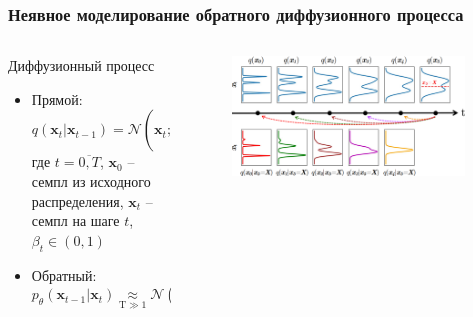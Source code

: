\documentclass[8pt]{beamer}
\begin{document}
\begin{frame}
	\frametitle{Неявное моделирование обратного диффузионного процесса}


	\begin{columns}
		\begin{column}{0.5\textwidth}
			\begin{block}{Диффузионный процесс}
				\begin{itemize}
				
					\item Прямой: 
					\begin{equation*}
					q(\textbf{x}_t|\textbf{x}_{t-1}) = \mathcal{N}(\textbf{x}_t; \textbf{x}_{t-1}\sqrt{1-\beta_t}, \beta_t 	\textbf{I})
					\end{equation*}
					где $t = \overline{0,T}$, $\textbf{x}_0$ -- семпл из исходного распределения, $\textbf{x}_t$ -- семпл на шаге $t$, $\beta_t\in (0,1)$\\
					
					\item Обратный: 
					\begin{equation*}
					p_\theta(\textbf{x}_{t-1}|\textbf{x}_t)\!\! \underset{\text{T} \gg 1}{ \approx}\!\!\! \mathcal{N}(\textbf{x}_{t-1};\mu_\theta(\textbf{x}_t,t), \Sigma_\theta(\textbf{x}_t, t))
					\end{equation*}
			
				\end{itemize}
			\end{block}		
		\end{column}
		
		\begin{column}{0.55\textwidth} 
				\begin{figure}[h!]
						\begin{flushright}
							\includegraphics[width=0.97\textwidth]{figures/distributions.png}
						\end{flushright}	
				\end{figure}
	

\end{column}
\end{columns}
\end{frame}
\end{document}
